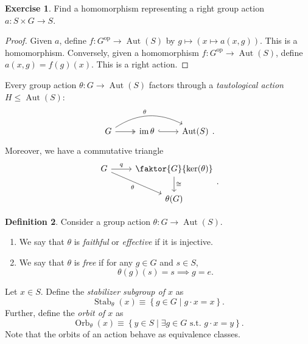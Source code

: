 \documentclass[10pt,letterpaper,cm]{nupset}
\theoremstyle{definition}
\newtheorem{definition}{Definition}[subsection]
\theoremstyle{theorem}
\newtheorem{exercise}[definition]{Exercise}
\theoremstyle{remark}
\newcommand{\1}{\mathbf{1}}
\newcommand{\0}{\vec 0}
\DeclareMathOperator{\aut}{Aut}
\DeclareMathOperator{\stab}{Stab}
\DeclareMathOperator{\orb}{Orb}
\DeclareMathOperator{\op}{op}
\DeclareMathOperator{\im}{im}
\begin{document}
\begin{exercise} 
Find a homomorphism representing a right group action $a: S \times G \to S$.
\end{exercise}
\begin{proof}
Given $a$, define $f: G^{\op} \to \aut(S)$ by $g \mapsto \left(x \mapsto a(x, g)\right)$. This is a homomorphism. Conversely, given a homomorphism $f: G^{\op} \to \aut(S)$, define $a(x, g) = f(g)(x)$. This is a right action.
\end{proof}

\medskip

Every group action $\theta: G \to \aut(S)$ factors through a \textit{tautological action} $H \leq \aut(S)$: 
\[
\begin{tikzcd}
G \arrow[r, two heads] \arrow[rr, "\theta", bend left] & \im{\theta} \arrow[r, hook] & \aut(S)
\end{tikzcd}.
\] Moreover, we have a commutative triangle
\[ \begin{tikzcd}
G \arrow{r}{q} \arrow[swap]{dr} {\theta} & \faktor{G}{\ker(\theta)} \arrow{d}{\cong} \\%
 & \theta(G)
\end{tikzcd}.
\]

\medskip



\begin{definition}
Consider a group action $\theta: G \to \aut(S)$.
\begin{enumerate}
\item We say that $\theta$ is \textit{faithful} or \textit{effective} if it is injective. 
\item We say that $\theta$ is \textit{free} if for any $g\in G$ and $s\in S$, 
\[
\theta(g)(s) =s \implies g =e.
\]
\end{enumerate}
\end{definition}

\smallskip

 Let $x\in S$. Define the \textit{stabilizer subgroup of $x$} as 
 \[
 \stab_{\theta}(x)  \equiv \left\{g \in G \mid g \cdot x = x\right\}.
 \] Further, define the \textit{orbit of $x$} as 
 \[
 \orb_{\theta}(x) \equiv \left\{y \in S \mid \exists g \in G \text{ s.t. }g \cdot x = y\right\}.
 \] Note that the orbits of an action behave as equivalence classes. 
\end{document}

